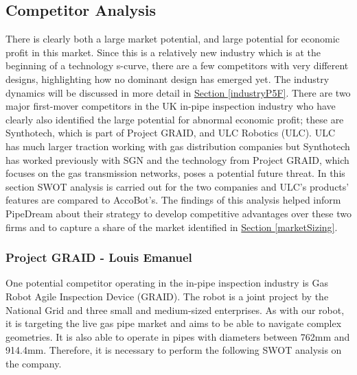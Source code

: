 \documentclass[11pt]{article}		%
\newcommand{\sectref}[1]{\hyperref[#1]{Section \ref*{#1}}}     %
\begin{document}
    \subsection{Competitor Analysis}
        There is clearly both a large market potential, and large potential for economic profit in this market. Since this is a relatively new industry which is at the beginning of a technology s-curve, there are a few competitors with very different designs, highlighting how no dominant design has emerged yet. The industry dynamics will be discussed in more detail in \sectref{industryP5F}. There are two major first-mover competitors in the UK in-pipe inspection industry who have clearly also identified the large potential for abnormal economic profit; these are Synthotech, which is part of Project GRAID, and ULC Robotics (ULC). ULC has much larger traction working with gas distribution companies but Synthotech has worked previously with SGN and the technology from Project GRAID, which focuses on the gas transmission networks, poses a potential future threat. In this section SWOT analysis is carried out for the two companies and ULC's products' features are compared to AccoBot's. The findings of this analysis helped inform PipeDream about their strategy to develop competitive advantages over these two firms and to capture a share of the market identified in \sectref{marketSizing}.

		\subsubsection[Project GRAID]{Project GRAID - Louis Emanuel}
		
			One potential competitor operating in the in-pipe inspection industry is Gas Robot Agile Inspection Device (GRAID). The robot is a joint project by the National Grid and three small and medium-sized enterprises. As with our robot, it is targeting the live gas pipe market and aims to be able to navigate complex geometries. It is also able to operate in pipes with diameters between 762mm and 914.4mm. Therefore, it is necessary to perform the following SWOT analysis on the company. \\
			
\end{document}
